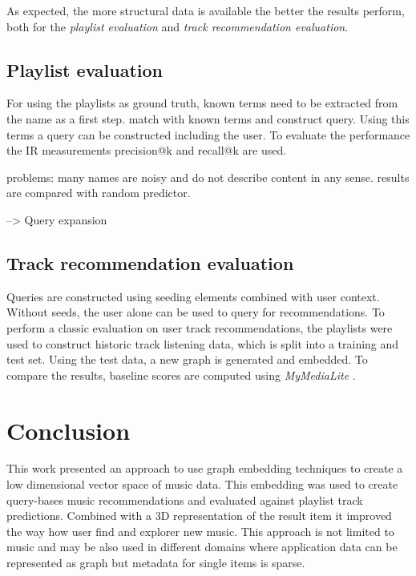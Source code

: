 \documentclass[a4paper]{llncs}
\begin{document}
	
	
	As expected, the more structural data is available the better the results perform, both for the \emph{playlist evaluation} and \emph{track recommendation evaluation}.
	
	\subsection{Playlist evaluation}
	\label{subsec:playlist_eval}
	For using the playlists as ground truth, known terms need to be extracted from the name as a first step. match with known terms and construct query. Using this terms a query can be constructed including the user. To evaluate the performance the IR measurements precision@k and recall@k are used.
	
	
	problems: many names are noisy and do not describe content in any sense. results are compared with random predictor.
	
	--> Query expansion
	
	
	
	
	\subsection{Track recommendation evaluation}
	\label{subsec:track_rec_eval}
	Queries are constructed using seeding elements combined with user context. Without seeds, the user alone can be used to query for recommendations. To perform a classic evaluation on user track recommendations, the playlists were used to construct historic track listening data, which is split into a training and test set. Using the test data, a new graph is generated and embedded. To compare the results, baseline scores are computed using \emph{MyMediaLite} \cite{Gantner2011MyMediaLite}.
	
	
	
	
	
	\section{Conclusion}
	This work presented an approach to use graph embedding techniques to create a low dimensional vector space of music data. This embedding was used to create query-bases music recommendations and evaluated against playlist track predictions. Combined with a 3D representation of the result item it improved the way how user find and explorer new music. 
	This approach is not limited to music and may be also used in different domains where application data can be represented as graph but metadata for single items is sparse.
	
\end{document}
